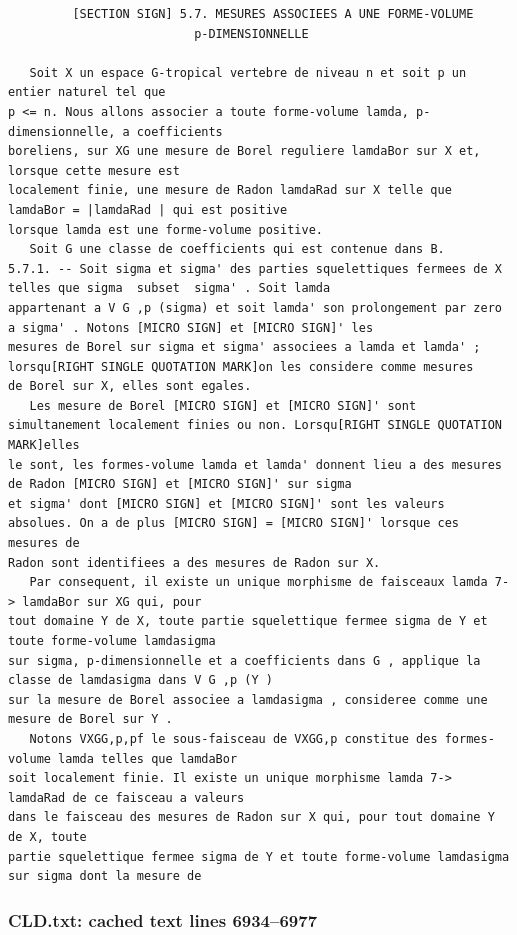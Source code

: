 \documentclass[
  11pt,
]{article}
\begin{document}
\begin{lstlisting}
         [SECTION SIGN] 5.7. MESURES ASSOCIEES A UNE FORME-VOLUME
                          p-DIMENSIONNELLE

   Soit X un espace G-tropical vertebre de niveau n et soit p un entier naturel tel que
p <= n. Nous allons associer a toute forme-volume lamda, p-dimensionnelle, a coefficients
boreliens, sur XG une mesure de Borel reguliere lamdaBor sur X et, lorsque cette mesure est
localement finie, une mesure de Radon lamdaRad sur X telle que lamdaBor = |lamdaRad | qui est positive
lorsque lamda est une forme-volume positive.
   Soit G une classe de coefficients qui est contenue dans B.
5.7.1. -- Soit sigma et sigma' des parties squelettiques fermees de X telles que sigma  subset  sigma' . Soit lamda
appartenant a V G ,p (sigma) et soit lamda' son prolongement par zero a sigma' . Notons [MICRO SIGN] et [MICRO SIGN]' les
mesures de Borel sur sigma et sigma' associees a lamda et lamda' ; lorsqu[RIGHT SINGLE QUOTATION MARK]on les considere comme mesures
de Borel sur X, elles sont egales.
   Les mesure de Borel [MICRO SIGN] et [MICRO SIGN]' sont simultanement localement finies ou non. Lorsqu[RIGHT SINGLE QUOTATION MARK]elles
le sont, les formes-volume lamda et lamda' donnent lieu a des mesures de Radon [MICRO SIGN] et [MICRO SIGN]' sur sigma
et sigma' dont [MICRO SIGN] et [MICRO SIGN]' sont les valeurs absolues. On a de plus [MICRO SIGN] = [MICRO SIGN]' lorsque ces mesures de
Radon sont identifiees a des mesures de Radon sur X.
   Par consequent, il existe un unique morphisme de faisceaux lamda 7-> lamdaBor sur XG qui, pour
tout domaine Y de X, toute partie squelettique fermee sigma de Y et toute forme-volume lamdasigma
sur sigma, p-dimensionnelle et a coefficients dans G , applique la classe de lamdasigma dans V G ,p (Y )
sur la mesure de Borel associee a lamdasigma , consideree comme une mesure de Borel sur Y .
   Notons VXGG,p,pf le sous-faisceau de VXGG,p constitue des formes-volume lamda telles que lamdaBor
soit localement finie. Il existe un unique morphisme lamda 7-> lamdaRad de ce faisceau a valeurs
dans le faisceau des mesures de Radon sur X qui, pour tout domaine Y de X, toute
partie squelettique fermee sigma de Y et toute forme-volume lamdasigma sur sigma dont la mesure de
\end{lstlisting}

\subsubsection{CLD.txt: cached text lines
6934--6977}\label{cld.txt-cached-text-lines-69346977}
\end{document}
